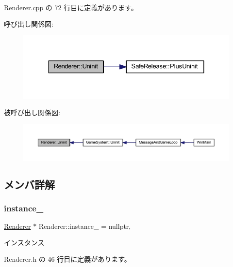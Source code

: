  Renderer.\+cpp の 72 行目に定義があります。

呼び出し関係図\+:\nopagebreak
\begin{figure}[H]
\begin{center}
\leavevmode
\includegraphics[width=324pt]{class_renderer_ae865246d6a04d467ac22458f6f5f69d4_cgraph}
\end{center}
\end{figure}
被呼び出し関係図\+:\nopagebreak
\begin{figure}[H]
\begin{center}
\leavevmode
\includegraphics[width=350pt]{class_renderer_ae865246d6a04d467ac22458f6f5f69d4_icgraph}
\end{center}
\end{figure}


\subsection{メンバ詳解}
\mbox{\label{class_renderer_aa0ca48ac8408e8726d5dd135432ae4fa}} 
\subsubsection{\texorpdfstring{instance\+\_\+}{instance\_}}
{\footnotesize\ttfamily \mbox{\hyperlink{class_renderer}{Renderer}} $\ast$ Renderer\+::instance\+\_\+ = nullptr\hspace{0.3cm}{\ttfamily [static]}, {\ttfamily [private]}}



インスタンス 



 Renderer.\+h の 46 行目に定義があります。

